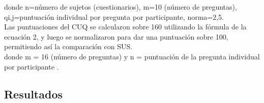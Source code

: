 donde n=número de sujetos (cuestionarios), m=10 (número de preguntas), qi,j=puntuación individual por pregunta por participante, norma=2,5.\\



Las puntuaciones del CUQ se calcularon sobre 160 utilizando la fórmula de la ecuación 2, y luego se normalizaron para dar una puntuación sobre 100, permitiendo así la comparación con SUS. \\


donde m = 16 (número de preguntas) y n = puntuación de la pregunta individual por participante \cite{cuq}.\\

\subsection{Resultados}
